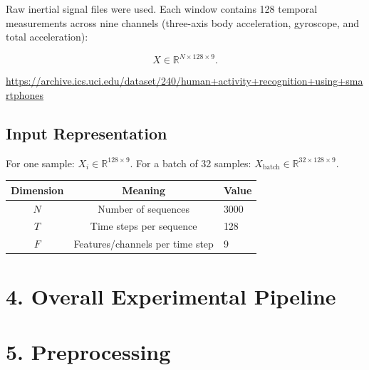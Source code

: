 \documentclass[10pt]{article}
\begin{document}
Raw inertial signal files were used. Each window contains 128 temporal
measurements across nine channels (three-axis body acceleration, gyroscope,
and total acceleration):

\[
X\in\mathbb{R}^{N\times128\times9}.
\]

\url{https://archive.ics.uci.edu/dataset/240/human+activity+recognition+using+smartphones}

\subsection*{Input Representation}

For one sample: $X_i\in\mathbb{R}^{128\times9}$.
For a batch of 32 samples: $X_{\mathrm{batch}}\in\mathbb{R}^{32\times128\times9}$.

\begin{center}
\begin{tabular}{|c|c|l|}
\hline
Dimension & Meaning & Value\\
\hline
$N$ & Number of sequences & 3000\\
$T$ & Time steps per sequence & 128\\
$F$ & Features/channels per time step & 9\\
\hline
\end{tabular}
\end{center}

\section*{4. Overall Experimental Pipeline}

\begin{center}
\end{center}

\section*{5. Preprocessing}
\end{document}
